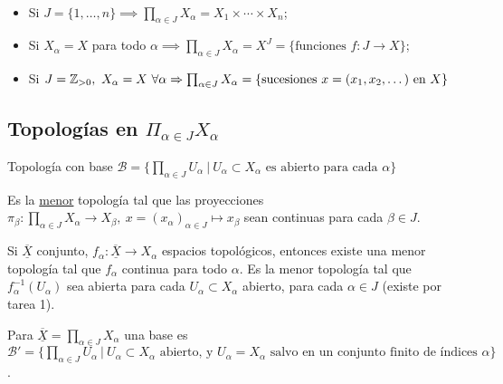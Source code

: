\documentclass[a4paper]{report}
\begin{document}
\begin{eg}~
	\begin{itemize}
		\item Si $J = \{1,\dots,n\} \implies \prod_{\alpha\in J} X_{\alpha} = X_1 \times \cdots \times X_n$;

		\item Si $X_{\alpha} = X$ para todo $\alpha \implies \prod_{\alpha \in J} X_{\alpha} = X^J = \{ \text{funciones } f:J\to X\}$;

		\item Si $J= \Z_{>0},\ X_{\alpha}=X\ \forall \alpha \implies \prod_{\alpha\in J} X_{\alpha} = \{\text{sucesiones } x=(x_1,x_2,\dots) \text{ en } X \}$ 
	\end{itemize}
\end{eg}

\subsection{Topologías en $\Pi_{\alpha\in J} X_{\alpha}$}

\begin{definition}
	Topología con base $\mathcal{B} = \{ \prod_{\alpha\in J} U_{\alpha} \ | \ U_{\alpha} \subset X_{\alpha} \text{ es abierto para cada } \alpha \}$
\end{definition}

\begin{definition}
	Es la \underline{menor} topología tal que las proyecciones $\pi_{\beta}: \prod_{\alpha \in J} X_{\alpha} \to X_{\beta},\ x=(x_{\alpha})_{\alpha\in J} \mapsto x_{\beta}$ sean continuas para cada $\beta \in J$.
\end{definition}

\begin{remark}
	Si $\underline{\overline{X}}$ conjunto, $f_{\alpha} : \underline{\overline{X}} \to X_{\alpha}$ espacios topológicos, entonces existe una menor topología tal que $f_{\alpha}$ continua para todo $\alpha$. Es la menor topología tal que $f_{\alpha}^{-1}(U_{\alpha})$ sea abierta para cada $U_{\alpha} \subset X_{\alpha}$ abierto, para cada $\alpha \in J$ (existe por tarea 1).
\end{remark}

\begin{remark}
	Para $\underline{\overline{X}} = \prod_{\alpha \in J} X_{\alpha}$ una base es $\mathcal{B}' = \{ \prod_{\alpha\in J} U_{\alpha} \ | \ U_{\alpha} \subset X_{\alpha} \text{ abierto, y } U_{\alpha} = X_{\alpha} \text{ salvo en un conjunto finito de índices } \alpha \}$.
\end{remark}
\end{document}
